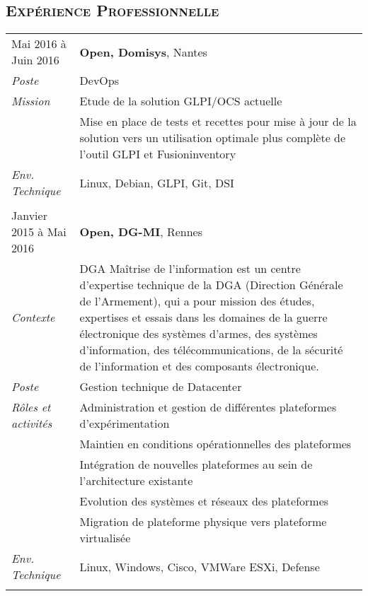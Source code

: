 \documentclass[a4paper,8pt]{article}
\newcommand{\hsubsection}[1]{\subsection*{\fontfamily{phv}\selectfont\textsc{#1}}}
\begin{document}
\hsubsection{Expérience Professionnelle}
\begin{tabular}{P{3.5cm}|p{13cm}}
Mai 2016 à Juin 2016		& \textbf{Open, Domisys}, Nantes\\
\textsl{Poste}				& DevOps\\
\textsl{Mission}			& Etude de la solution GLPI/OCS actuelle\\
							& Mise en place de tests et recettes pour mise à jour de la solution vers un utilisation optimale  plus complète de l'outil GLPI et Fusioninventory\\
\textsl{Env. Technique}		& Linux, Debian, GLPI, Git, DSI \\
 & \\

Janvier 2015 à Mai 2016		& \textbf{Open, DG-MI}, Rennes\\
\textsl{Contexte}      		& DGA Maîtrise de l'information est un centre d'expertise technique de la DGA (Direction Générale de l'Armement), qui a pour mission des études, expertises et essais dans les domaines de la guerre électronique des systèmes d'armes, des systèmes d'information, des télécommunications, de la sécurité de l'information et des composants électronique.\\
\textsl{Poste}				& Gestion technique de Datacenter\\
\textsl{Rôles et activités}	& Administration et gestion de différentes plateformes d'expérimentation\\
							& Maintien en conditions opérationnelles des plateformes\\
							& Intégration de nouvelles plateformes au sein de l'architecture existante\\
							& Evolution des systèmes et réseaux des plateformes\\
							& Migration de plateforme physique vers plateforme virtualisée\\
\textsl{Env. Technique}		& Linux, Windows, Cisco, VMWare ESXi, Defense\\
 & \\


\end{tabular}
\end{document}
